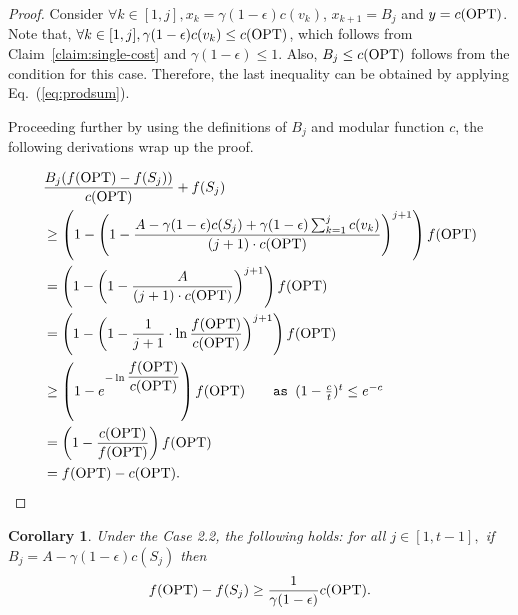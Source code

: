 \documentclass[10pt]{article} %
\newtheorem{corollary}[theorem]{Corollary}
\theoremstyle{remark}
\newcommand{\OPT}{{\rm OPT}}
\begin{document}
\begin{proof}
Consider $\forall k\in [1,j], x_k = \gamma(1-\epsilon) c(v_k)$, $x_{k+1} = B_j$ and $y = c(\OPT)$. Note that, 
$\forall k\in [1,j], \gamma(1-\epsilon) c(v_k) \leq c(\OPT)$, which follows from Claim~\ref{claim:single-cost} and 
$\gamma(1-\epsilon) \leq 1$. Also, $B_j \leq c(\OPT)$ follows from the condition for this case. Therefore, the last inequality can be obtained by applying Eq.~(\ref{eq:prodsum}).

Proceeding further by using the definitions of $B_j$ and modular function $c$, the following derivations wrap up the proof.

\begin{align*}
    &\displaystyle\frac{B_j(f(\OPT) - f(S_{j}))}{c(\OPT)} +f(S_{j}) \\
    &\geq \left( 1- \displaystyle\left(1- \frac{A-\gamma(1-\epsilon)c(S_j)+\gamma(1-\epsilon) \sum_{k=1}^{j}c(v_k)}{(j+1)\cdot c(\OPT)} \right)^{j+1} \right)f(\OPT)\\
    &= \left( 1- \displaystyle\left( 1- \frac{A}{(j+1)\cdot c(\OPT)} \right)^{j+1} \right)f(\OPT) \\
        &= \left( 1- \displaystyle\left( 1- \frac{1}{j+1}\cdot \ln \frac{f(\OPT)}{c(\OPT)} \right)^{j+1} \right)f(\OPT) \\
        &\geq \left(1- e^{-\ln \displaystyle\frac{f(\OPT)}{c(\OPT)}}\right)f(\OPT) \quad \quad \mbox{\tt as $(1- \frac{c}{t} )^t \leq e^{-c}$ } \\
        &=\left( 1- \displaystyle\frac{c(\OPT)}{f(\OPT)} \right)f(\OPT)\\
        &= f(\OPT)-c(\OPT).
\end{align*}
\end{proof}
      
        
\begin{corollary} 
\label{col:lower-opt}
Under the Case 2.2,
the following holds: 
for all $j \in  [1, t-1],$ if $B_j=A-\gamma(1-\epsilon) c(S_{j})$ then 
\[f(\OPT) -f(S_{j}) \geq \displaystyle\frac{1}{\gamma(1-\epsilon)}c(\OPT).\]
\end{corollary}
\end{document}

